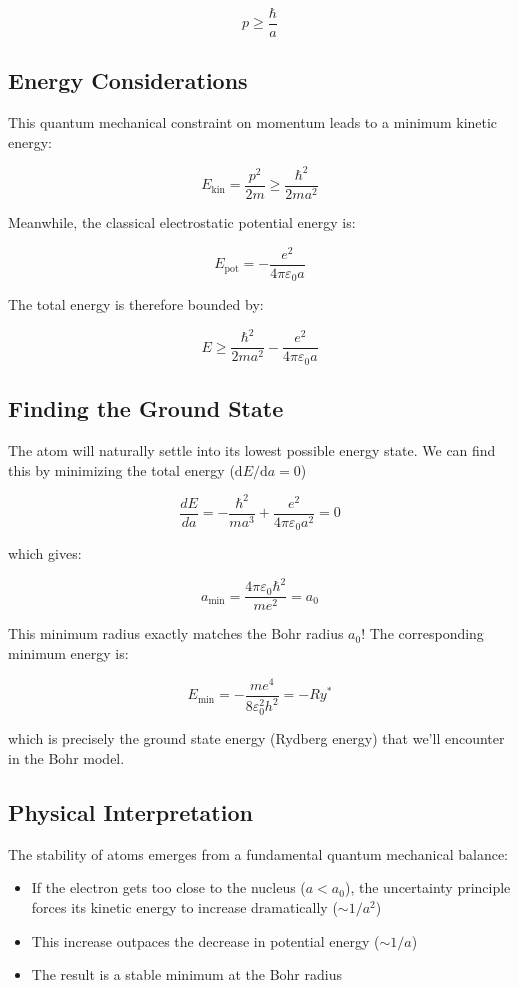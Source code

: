 \documentclass[
  a4paper,
]{book}
\providecommand{\tightlist}{%
  \setlength{\itemsep}{0pt}\setlength{\parskip}{0pt}}
\begin{document}
\[
p \ge \frac{\hbar}{a}
\]

\subsection{Energy Considerations}\label{energy-considerations}

This quantum mechanical constraint on momentum leads to a minimum
kinetic energy:

\[
E_{\mathrm{kin}} = \frac{p^2}{2m} \ge \frac{\hbar^2}{2ma^2}
\]

Meanwhile, the classical electrostatic potential energy is:

\[
E_{\mathrm{pot}} = - \frac{e^2}{4 \pi \varepsilon_0 a}
\]

The total energy is therefore bounded by:

\[
E \ge \frac{\hbar^2}{2ma^2} - \frac{e^2}{4 \pi \varepsilon_0 a}
\]

\subsection{Finding the Ground State}\label{finding-the-ground-state}

The atom will naturally settle into its lowest possible energy state. We
can find this by minimizing the total energy
(\(\mathrm{d}E/\mathrm{d}a = 0\))

\[
\frac{dE}{da} = -\frac{\hbar^2}{ma^3} + \frac{e^2}{4 \pi \varepsilon_0 a^2} = 0
\]

which gives:

\[
a_{\mathrm{min}} = \frac{4 \pi \varepsilon_0 \hbar^2}{m e^2} = a_0
\]

This minimum radius exactly matches the Bohr radius \(a_0\)! The
corresponding minimum energy is:

\[
E_{\mathrm{min}} = - \frac{m e^4}{8 \varepsilon_0^2 h^2} = - Ry^{\ast}
\]

which is precisely the ground state energy (Rydberg energy) that we'll
encounter in the Bohr model.

\subsection{Physical Interpretation}\label{physical-interpretation}

The stability of atoms emerges from a fundamental quantum mechanical
balance:

\begin{itemize}
\tightlist
\item
  If the electron gets too close to the nucleus (\(a < a_0\)), the
  uncertainty principle forces its kinetic energy to increase
  dramatically (\(\sim 1/a^2\))
\item
  This increase outpaces the decrease in potential energy (\(\sim 1/a\))
\item
  The result is a stable minimum at the Bohr radius
\end{itemize}
\end{document}
